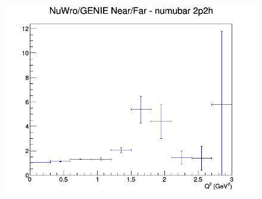 \documentclass[12pt]{article}
\begin{document}
\begin{figure}[h]
\endminipage
{}
\includegraphics[width=\linewidth]{eff_Q2/FGT/ratios/2p2h_NuWro_GENIE_numubar_NF_Q2.png}
\endminipage
\newline
\end{figure}
\clearpage
\end{document}
